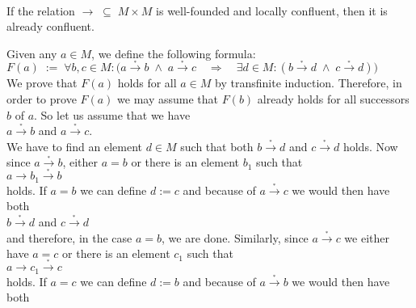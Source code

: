 \begin{Theorem} \hspace*{\fill} \\
  If the relation $\rightarrow \;\subseteq\; M \times M$ is well-founded and locally confluent, then it is
  already confluent.
\end{Theorem}

\proof
Given any $a \in M$, we define the following formula:
\\[0.2cm]
\hspace*{1.3cm}
$F(a) \;:=\; \forall b, c \in M: \bigl(a \stackrel{_*}{\rightarrow} b \;\wedge\; a \stackrel{_*}{\rightarrow}c \quad\Rightarrow\quad
 \exists d \in M: (b \stackrel{_*}{\rightarrow} d \;\wedge\; c \stackrel{_*}{\rightarrow} d)\bigr)
$
\\[0.2cm]
We  prove that $F(a)$ holds for all $a \in M$ by transfinite induction.
Therefore, in order to prove $F(a)$ we may assume that $F(b)$ already holds for all successors $b$ of $a$.
So let us assume that we have
\\[0.2cm]
\hspace*{1.3cm}
$a \stackrel{_*}{\rightarrow} b$ \quad and \quad $a \stackrel{_*}{\rightarrow} c$.
\\[0.2cm]
We have to find an element $d \in M$ such that both $b \stackrel{_*}{\rightarrow} d$ and $c \stackrel{_*}{\rightarrow} d$ holds.
Now since $a \stackrel{_*}{\rightarrow} b$, either $a = b$ or there is an element $b_1$ such that
\\[0.2cm]
\hspace*{1.3cm}
$a \rightarrow b_1 \stackrel{_*}{\rightarrow} b$
\\[0.2cm]
holds.  If $a = b$ we can define $d := c$ and because of $a \stackrel{_*}{\rightarrow} c$ we would then have both
\\[0.2cm]
\hspace*{1.3cm}
$b \stackrel{_*}{\rightarrow} d$ \quad and \quad $c \stackrel{_*}{\rightarrow} d$
\\[0.2cm]
and therefore, in the case $a = b$, we are done.  Similarly, since $a \stackrel{_*}{\rightarrow} c$ we either have
$a = c$ or there is an element $c_1$ such that
\\[0.2cm]
\hspace*{1.3cm}
$a \rightarrow c_1 \stackrel{_*}{\rightarrow} c$
\\[0.2cm]
holds.  If $a = c$ we can define $d := b$ and because of $a \stackrel{_*}{\rightarrow} b$ we would then have both
